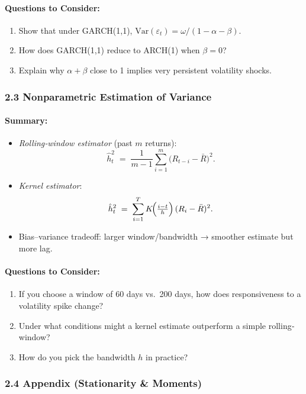 \documentclass[11pt]{amsart}
\begin{document}
\paragraph{Questions to Consider:}
\begin{enumerate}[noitemsep,left=0pt]
  \item Show that under GARCH(1,1), $\mathrm{Var}(\varepsilon_t) = \omega/(1 - \alpha - \beta)$.
  \item How does GARCH(1,1) reduce to ARCH(1) when $\beta = 0$?
  \item Explain why $\alpha + \beta$ close to 1 implies very persistent volatility shocks.
\end{enumerate}

\subsubsection{2.3 Nonparametric Estimation of Variance}
\paragraph{Summary:}
\begin{itemize}[noitemsep,left=0pt]
  \item \emph{Rolling‐window estimator} (past $m$ returns):
    \[
      \hat h_t^2 \;=\; \frac{1}{m - 1}\sum_{i=1}^m \bigl(R_{t-i} - \bar{R}\bigr)^2.
    \]
  \item \emph{Kernel estimator}:
    \[
      \hat h_t^2 \;=\; \sum_{i=1}^T K\!\Bigl(\tfrac{i - t}{h}\Bigr)\,(R_i - \bar{R})^2.
    \]
  \item Bias–variance tradeoff: larger window/bandwidth → smoother estimate but more lag.
\end{itemize}

\paragraph{Questions to Consider:}
\begin{enumerate}[noitemsep,left=0pt]
  \item If you choose a window of 60 days vs.\ 200 days, how does responsiveness to a volatility spike change?
  \item Under what conditions might a kernel estimate outperform a simple rolling‐window?
  \item How do you pick the bandwidth $h$ in practice?
\end{enumerate}

\subsubsection{2.4 Appendix (Stationarity \& Moments)}
\end{document}
